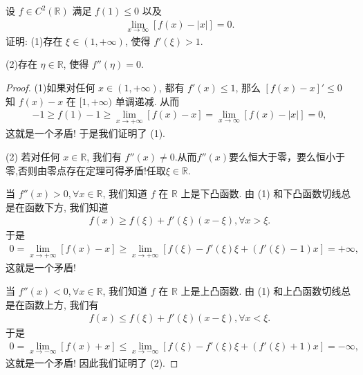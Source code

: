 \documentclass[../../main.tex]{subfiles}%
\begin{document}
\begin{example}
设 $f\in C^2(\mathbb{R})$ 满足 $f(1)\leqslant0$ 以及
\begin{align*}
\lim_{x\to\infty}[f(x)-|x|]=0.
\tag{12.27}
\end{align*}
证明:
(1)存在 $\xi\in(1,+\infty)$, 使得 $f'(\xi)>1$.

(2)存在 $\eta\in\mathbb{R}$, 使得 $f''(\eta)=0$.
\end{example}
\begin{proof}

(1)如果对任何 $x\in(1,+\infty)$, 都有 $f'(x)\leqslant1$, 那么 $[f(x)-x]'\leqslant0$ 知 $f(x)-x$ 在 $[1,+\infty)$ 单调递减. 从而
\begin{align*}
-1\geqslant f(1)-1\geqslant\lim_{x\to+\infty}[f(x)-x]=\lim_{x\to\infty}[f(x)-|x|]=0,
\end{align*}
这就是一个矛盾! 于是我们证明了 (1).

(2)
若对任何 $x\in\mathbb{R}$, 我们有 $f''(x)\neq0$.从而$f''(x)$要么恒大于零，要么恒小于零,否则由零点存在定理可得矛盾!任取$\xi \in \mathbb{R}$.

当 $f''(x)>0,\forall x\in\mathbb{R}$, 我们知道 $f$ 在 $\mathbb{R}$ 上是下凸函数. 由 (1) 和下凸函数切线总是在函数下方, 我们知道
\begin{align*}
f(x)\geqslant f(\xi)+f'(\xi)(x-\xi),\forall x>\xi.
\end{align*}
于是
\begin{align*}
0=\lim_{x\to+\infty}[f(x)-x]\geqslant\lim_{x\to+\infty}[f(\xi)-f'(\xi)\xi+(f'(\xi)-1)x]=+\infty,
\end{align*}
这就是一个矛盾!

当 $f''(x)<0,\forall x\in\mathbb{R}$, 我们知道 $f$ 在 $\mathbb{R}$ 上是上凸函数. 由 (1) 和上凸函数切线总是在函数上方, 我们有
\begin{align*}
f(x)\leqslant f(\xi)+f'(\xi)(x-\xi),\forall x<\xi.
\end{align*}
于是
\begin{align*}
0=\lim_{x\to-\infty}[f(x)+x]\leqslant\lim_{x\to-\infty}[f(\xi)-f'(\xi)\xi+(f'(\xi)+1)x]=-\infty,
\end{align*}
这就是一个矛盾! 因此我们证明了 (2). 

\end{proof}
\end{document}
